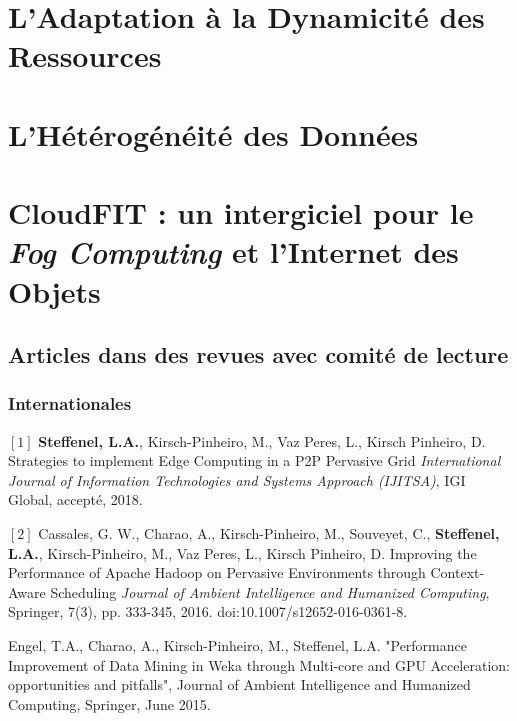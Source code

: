 \documentclass[final,twoside]{hdr} %
\begin{document}


\chapter{L'Adaptation à la Dynamicité des Ressources}



\chapter{L'Hétérogénéité des Données}




\chapter{CloudFIT : un intergiciel pour le \textit{Fog Computing} et l'Internet des Objets\label{chap:CloudFIT}}








\section*{Articles dans des revues avec comité de lecture}

\subsection*{Internationales}

\noindent $[1]$
{\bf Steffenel, L.A.}, Kirsch-Pinheiro, M., Vaz Peres, L., Kirsch Pinheiro, D.
{Strategies to implement Edge Computing in a P2P Pervasive Grid}
{\em International Journal of Information Technologies and Systems Approach (IJITSA)}, IGI Global, accepté, 2018.

\noindent $[2]$
Cassales, G. W., Charao, A., Kirsch-Pinheiro, M., Souveyet, C., {\bf Steffenel, L.A.}, Kirsch-Pinheiro, M., Vaz Peres, L., Kirsch Pinheiro, D.
{Improving the Performance of Apache Hadoop on Pervasive Environments through Context-Aware Scheduling}
{\em  Journal of Ambient Intelligence and Humanized Computing}, Springer, 7(3), pp. 333-345, 2016. doi:10.1007/s12652-016-0361-8.

Engel, T.A., Charao, A., Kirsch-Pinheiro, M., Steffenel, L.A. "Performance Improvement of Data Mining in Weka through Multi-core and GPU Acceleration: opportunities and pitfalls", Journal of Ambient Intelligence and Humanized Computing, Springer, June 2015. 
\end{document}
